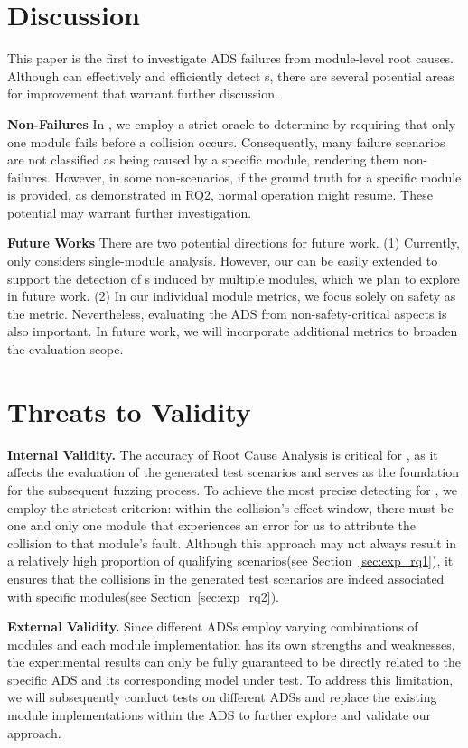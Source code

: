 \section{Discussion}
This paper is the first to investigate ADS failures from module-level root causes. Although \tool can effectively and efficiently detect {\mccs}s, there are several potential areas for improvement that warrant further discussion.

\noindent \textbf{Non-\mccs Failures}
In \tool, we employ a strict oracle to determine \mccs by requiring that only one module fails before a collision occurs. Consequently, many failure scenarios are not classified as being caused by a specific module, rendering them non-\mccs failures. However, in some non-\mccs scenarios, if the ground truth for a specific module is provided, as demonstrated in RQ2, normal operation might resume. These potential \mccs may warrant further investigation.

\noindent \textbf{Future Works} There are two potential directions for future work. (1) Currently, \tool only considers single-module analysis. However, our \tool can be easily extended to support the detection of {\mccs}s induced by multiple modules, which we plan to explore in future work. (2) In our individual module metrics, we focus solely on safety as the metric. Nevertheless, evaluating the ADS from non-safety-critical aspects is also important. In future work, we will incorporate additional metrics to broaden the evaluation scope.

\section{Threats to Validity}\label{sec: threats}

\noindent\textbf{Internal Validity.}
The accuracy of Root Cause Analysis is critical for \abb{}, as it affects the evaluation of the generated test scenarios and serves as the foundation for the subsequent fuzzing process. To achieve the most precise detecting for \mccs, we employ the strictest criterion: within the collision's effect window, there must be one and only one module that experiences an error for us to attribute the collision to that module's fault. Although this approach may not always result in a relatively high proportion of qualifying scenarios(see Section~\ref{sec:exp_rq1}), it ensures that the collisions in the generated test scenarios are indeed associated with specific modules(see Section~\ref{sec:exp_rq2}).

\noindent \textbf{External Validity.}
Since different ADSs employ varying combinations of modules and each module implementation has its own strengths and weaknesses, the experimental results can only be fully guaranteed to be directly related to the specific ADS and its corresponding model under test. To address this limitation, we will subsequently conduct tests on different ADSs and replace the existing module implementations within the ADS to further explore and validate our approach.
